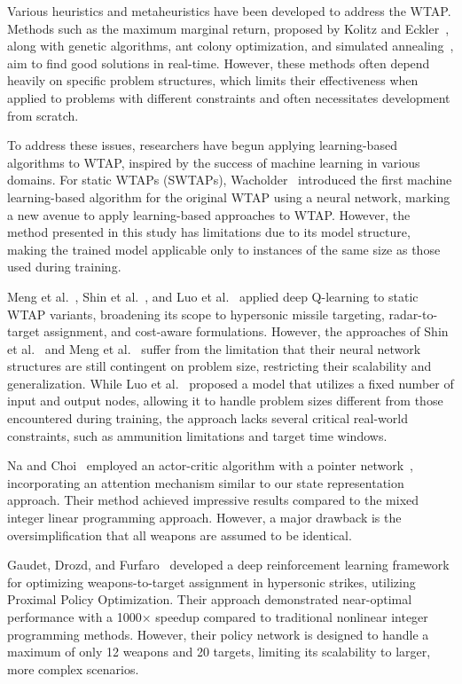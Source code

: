 \documentclass[smallcondensed]{svjour3}
\begin{document}
Various heuristics and metaheuristics have been developed to address the WTAP. Methods such as the maximum marginal return, proposed by Kolitz and Eckler~\cite{kolitz1988analysis}, along with genetic algorithms, ant colony optimization, and simulated annealing~\cite{lee2002immunity,lee2003efficiently,durgut2017artificial,sonuc2017parallel,chang2018solving,metler1990suite}, aim to find good solutions in real-time. However, these methods often depend heavily on specific problem structures, which limits their effectiveness when applied to problems with different constraints and often necessitates development from scratch.

To address these issues, researchers have begun applying learning-based algorithms to WTAP, inspired by the success of machine learning in various domains. For static WTAPs (SWTAPs), Wacholder~\cite{wacholder1989neural} introduced the first machine learning-based algorithm for the original WTAP using a neural network, marking a new avenue to apply learning-based approaches to WTAP. However, the method presented in this study has limitations due to its model structure, making the trained model applicable only to instances of the same size as those used during training.

Meng et al.~\cite{meng2021deep}, Shin et al.~\cite{shin2020mean}, and Luo et al.~\cite{luo2021learning} applied deep Q-learning to static WTAP variants, broadening its scope to hypersonic missile targeting, radar-to-target assignment, and cost-aware formulations. However, the approaches of Shin et al.~\cite{shin2020mean} and Meng et al.~\cite{meng2021deep} suffer from the limitation that their neural network structures are still contingent on problem size, restricting their scalability and generalization. While Luo et al.~\cite{luo2021learning} proposed a model that utilizes a fixed number of input and output nodes, allowing it to handle problem sizes different from those encountered during training, the approach lacks several critical real-world constraints, such as ammunition limitations and target time windows.

Na and Choi~\cite{na2023weapon} employed an actor-critic algorithm with a pointer network~\cite{vinyals2015pointer}, incorporating an attention mechanism similar to our state representation approach. Their method achieved impressive results compared to the mixed integer linear programming approach. However, a major drawback is the oversimplification that all weapons are assumed to be identical.

Gaudet, Drozd, and Furfaro~\cite{gaudet2023} developed a deep reinforcement learning framework for optimizing weapons-to-target assignment in hypersonic strikes, utilizing Proximal Policy Optimization. Their approach demonstrated near-optimal performance with a 1000$\times$ speedup compared to traditional nonlinear integer programming methods. However, their policy network is designed to handle a maximum of only 12 weapons and 20 targets, limiting its scalability to larger, more complex scenarios.
\end{document}
